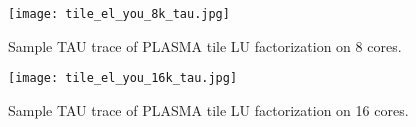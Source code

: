 \documentclass[11pt,letterpaper]{article}
\begin{document}
\begin{figure}
\centering
\texttt{[image: tile\_el\_you\_8k\_tau.jpg]}
\caption{Sample TAU trace of PLASMA tile LU factorization on 8 cores.}
\label{fig:plasma_8}
\end{figure}

\begin{figure}
\centering
\texttt{[image: tile\_el\_you\_16k\_tau.jpg]}
\caption{Sample TAU trace of PLASMA tile LU factorization on 16 cores.}
\label{fig:plasma_16}
\end{figure}

\end{document}

